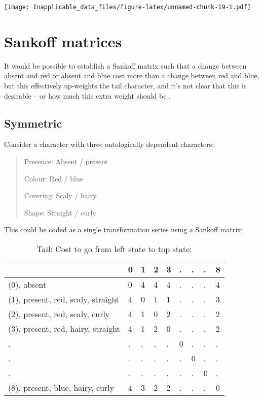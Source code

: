 \documentclass[]{book}
\theoremstyle{definition}
\theoremstyle{definition}
\theoremstyle{definition}
\theoremstyle{remark}
\begin{document}
\texttt{[image: Inapplicable\_data\_files/figure-latex/unnamed-chunk-19-1.pdf]}

\section{Sankoff matrices}\label{sankoff-matrices}

It would be possible to establish a Sankoff matrix
\citep{Sankoff1975, Sankoff1983} such that a change between absent and
red or absent and blue cost more than a change between red and blue, but
this effectively up-weights the tail character, and it's not clear that
this is desirable -- or how much this extra weight should be
\citep{Maddison1993}.

\subsection{Symmetric}\label{symmetric}

Consider a character with three ontologically dependent characters:

\begin{quote}
Presence: Absent / present

Colour: Red / blue

Covering: Scaly / hairy

Shape: Straight / curly
\end{quote}

This could be coded as a single transformation series using a Sankoff
matrix:

\begin{table}

\caption{\label{tab:unnamed-chunk-20}Tail: Cost to go from left state to top state:}
\centering
\begin{tabular}[t]{l|l|l|l|l|l|l|l|l}
\hline
  & 0 & 1 & 2 & 3 & . & . & . & 8\\
\hline
(0), absent & 0 & 4 & 4 & 4 & . & . & . & 4\\
\hline
(1), present, red, scaly, straight & 4 & 0 & 1 & 1 & . & . & . & 3\\
\hline
(2), present, red, scaly, curly & 4 & 1 & 0 & 2 & . & . & . & 2\\
\hline
(3), present, red, hairy, straight & 4 & 1 & 2 & 0 & . & . & . & 2\\
\hline
. & . & . & . & . & 0 & . & . & .\\
\hline
. & . & . & . & . & . & 0 & . & .\\
\hline
. & . & . & . & . & . & . & 0 & .\\
\hline
(8), present, blue, hairy, curly & 4 & 3 & 2 & 2 & . & . & . & 0\\
\hline
\end{tabular}
\end{table}
\end{document}

